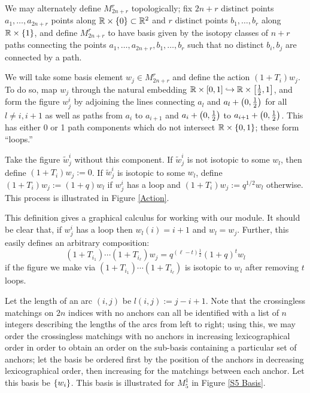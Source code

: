 \documentclass{amsart}
\begin{document}
  We may alternately define $M_{2n + r}^r$ topologically;
  fix $2n + r$ distinct points $a_1,\dots,a_{2n + r}$ points along $\mathbb{R} \times \left\{ 0 \right\} \subset \mathbb{R}^2$ and $r$ distinct points $b_1,\dots,b_r$ along $\mathbb{R} \times \left\{ 1 \right\}$, and define $M_{2n + r}^r$ to have basis given by the isotopy classes of $n + r$ paths connecting the points $a_1,\dots,a_{2n+r},b_1,\dots,b_r$ such that no distinct $b_i,b_j$ are connected by a path. 
  
  We will take some basis element $w_j \in M_{2n +r}^r$ and define the action $(1 + T_i)w_j$.
  To do so, map $w_j$ through the natural embedding $\mathbb{R} \times \left[ 0,1 \right] \hookrightarrow \mathbb{R} \times \left[ \frac{1}{2},1 \right]$, and form the figure $w_j^i$ by adjoining the lines connecting $a_l$ and $a_l + \left( 0,\frac{1}{2} \right)$ for all $l \neq i,i+1$ as well as paths from $a_i$ to $a_{i+1}$ and $a_i + \left( 0,\frac{1}{2} \right)$ to $a_{i+1} + \left( 0,\frac{1}{2} \right)$.
  This has either 0 or 1 path components which do not intersect $\mathbb{R} \times \left\{ 0,1 \right\}$;
  these form ``loops.''

  Take the figure $\tilde w_j^i$ without this component.
  If $\tilde w_j^i$ is not isotopic to some $w_l$, then define $(1 + T_i)w_j := 0$.
  If $\tilde w_j^i$ is isotopic to some $w_l$, define $(1 + T_i)w_j := (1 + q)w_l$ if $w_j^i$ has a loop and $(1 + T_i)w_j := q^{1/2}w_l$ otherwise.
  This process is illustrated in Figure \ref{Action}.

  \begin{remark}
    This definition gives a graphical calculus for working with our module.
    It should be clear that, if $w_j^i$ has a loop then $w_l(i) = i+1$ and $w_l = w_j$.
    Further, this easily defines an arbitrary composition:
    \[
      (1 + T_{i_1})\cdots(1 + T_{i_\ell})w_j = q^{(\ell - t)\frac{1}{2}}(1 + q)^tw_l
    \]
    if the figure we make  via $(1+T_{i_1})\cdots(1+T_{i_\ell})$ is isotopic to $w_l$ after removing $t$ loops.
  \end{remark}

  Let the length of an arc $(i,j)$ be $l(i,j) := j - i + 1$.
  Note that the crossingless matchings on $2n$ indices with no anchors can all be identified with a list of $n$ integers describing the lengths of the arcs from left to right;
  using this, we may order the crossingless matchings with no anchors in increasing lexicographical order in order to obtain an order on the sub-basis containing a particular set of anchors;
  let the basis be ordered first by the position of the anchors in decreasing lexicographical order, then increasing for the matchings between each anchor.
  Let this basis be $\left\{ w_i \right\}$.
  This basis is illustrated for $M_{5}^1$ in Figure \ref{S5 Basis}. 
\end{document}
